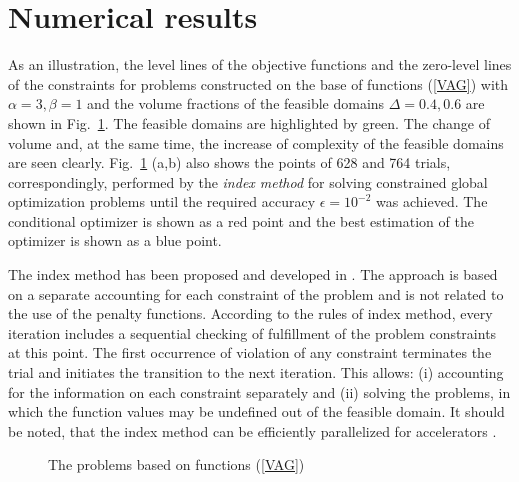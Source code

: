 \documentclass{aip-cp}
\begin{document}
\section{Numerical results}

As an illustration, the level lines of the objective functions and the zero-level lines of the constraints for problems constructed on the base of functions (\ref{VAG}) with $\alpha = 3, \beta = 1$ and the volume fractions of the feasible domains $\Delta = 0.4, 0.6$ are shown in Fig.~\ref{fig:VAG}. The feasible domains are highlighted by green. The change of volume and, at the same time, the increase of complexity of the feasible domains are seen clearly. Fig.~\ref{fig:VAG} (a,b) also shows the points of 628 and 764 trials, correspondingly, performed by the \textit{index method} for solving constrained global optimization problems until the required accuracy $\epsilon=10^{-2}$ was achieved. The conditional optimizer is shown as a red point and the best estimation of the optimizer is shown as a blue point.

The index method has been proposed and developed in \cite{Strongin2000,Sergeyev2001,Barkalov2002}. The approach is based on a separate accounting for each constraint of the problem and is not related to the use of the penalty functions. According to the rules of index method, every iteration includes a sequential checking of fulfillment of the problem constraints at this point. The first occurrence of violation of any constraint terminates the trial and initiates the transition to the next iteration. This allows: (i) accounting for the information on each constraint separately and (ii) solving the problems, in which the function values may be undefined out of the feasible domain.  It should be noted, that the index method can be efficiently parallelized for accelerators \cite{Barkalov2015,Barkalov2016}.

\begin{figure}
\begin{minipage}{0.5\linewidth}
\end{minipage}
\hfill
\begin{minipage}{0.5\linewidth}
\end{minipage}
\caption{The problems based on functions (\ref{VAG}) }
\label{fig:VAG}
\end{figure}
\end{document}
